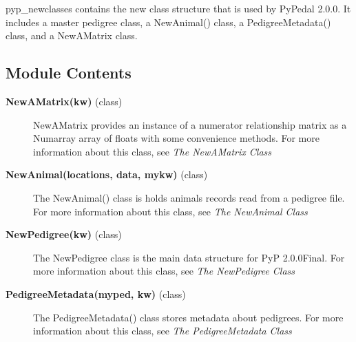 pyp\_newclasses contains the new class structure that is used by PyPedal 2.0.0. It includes a master pedigree class, a NewAnimal() class, a PedigreeMetadata() class, and a NewAMatrix class.

\subsection*{Module Contents}

\begin{description}
\item[\textbf{NewAMatrix(kw)} (class)]
NewAMatrix provides an instance of a numerator relationship matrix as a Numarray array of floats with some convenience methods.
For more information about this class, see \emph{The NewAMatrix Class}

\item[\textbf{NewAnimal(locations, data, mykw)} (class)]
The NewAnimal() class is holds animals records read from a pedigree file.
For more information about this class, see \emph{The NewAnimal Class}

\item[\textbf{NewPedigree(kw)} (class)]
The NewPedigree class is the main data structure for PyP 2.0.0Final.
For more information about this class, see \emph{The NewPedigree Class}

\item[\textbf{PedigreeMetadata(myped, kw)} (class)]
The PedigreeMetadata() class stores metadata about pedigrees.
For more information about this class, see \emph{The PedigreeMetadata Class}
\end{description}

